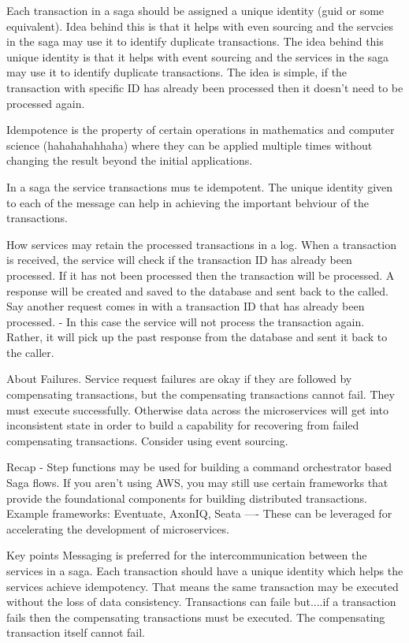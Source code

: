 Each transaction in a saga should be assigned a unique identity (guid or some equivalent). Idea behind this is that it helps with even sourcing and the servcies in the saga may use it to identify duplicate transactions.
The idea behind this unique identity is that it helps with event sourcing and the services in the saga may use it to identify duplicate transactions.
The idea is simple, if the transaction with specific ID has already been processed then it doesn't need to be processed again.

Idempotence is the property of certain operations in mathematics and computer science (hahahahahhaha) where they can be applied multiple times without changing the result beyond the initial applications.

In a saga the service transactions mus te idempotent. The unique identity given to each of the message can help in achieving the important behviour of the transactions.

How services may retain the processed transactions in a log.
When a transaction is received, the service will check if the transaction ID has already been processed.
If it has not been processed then the transaction will be processed.
A response will be created and saved to the database and sent back to the called.
Say another request comes in with a transaction  ID that has already been processed.
- In this case the service will not process the transaction again.
Rather, it will pick up the past response from the database and sent it back to the caller.

About Failures.
Service request failures are okay if they are followed by compensating transactions, but the compensating transactions cannot fail.
They must execute successfully.
Otherwise data across the microservices will get into inconsistent state in order to build a capability for recovering from failed compensating transactions.
Consider using event sourcing.

Recap - Step functions may be used for building a command orchestrator based Saga flows.
If you aren't using AWS, you may still use certain frameworks that provide the foundational components for building distributed transactions.
Example frameworks: Eventuate, AxonIQ, Seata ---- These can be leveraged for accelerating the development of microservices.

Key points
Messaging is preferred for the intercommunication between the services in a saga.
Each transaction should have a unique identity which helps the services achieve idempotency.
That means the same transaction may be executed without the loss of data consistency.
Transactions can faile but....if a transaction fails then the compensating transactions must be executed.
The compensating transaction itself cannot fail.

